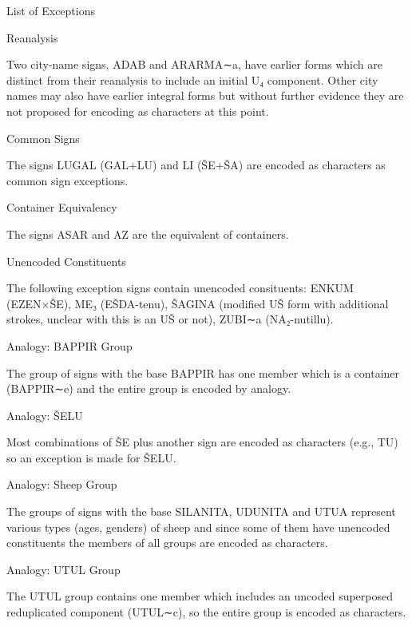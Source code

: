 \Henddl
\Hhh{}List of Exceptions

\Hhhh{}Reanalysis


\par Two city-name signs, ADAB and ARARMA∼a, have earlier forms
      which are distinct from their reanalysis to include an initial
      U₄ component.  Other city names may also have earlier integral
      forms but without further evidence they are not proposed for
      encoding as characters at this point.

\Hhhh{}Common Signs


\par The signs LUGAL (GAL+LU) and LI (ŠE+ŠA) are encoded as
      characters as common sign exceptions.

\Hhhh{}Container Equivalency


\par The signs ASAR and AZ are the equivalent of containers.

\Hhhh{}Unencoded Constituents


\par The following exception signs contain unencoded consituents:
      ENKUM (EZEN×ŠE), ME₃ (EŠDA-tenu), ŠAGINA (modified UŠ form with
      additional strokes, unclear with this is an UŠ or not), ZUBI∼a
      (NA₂-nutillu).

\Hhhh{}Analogy: BAPPIR Group


\par The group of signs with the base BAPPIR has one member which
      is a container (BAPPIR∼e) and the entire group is encoded by
      analogy.

\Hhhh{}Analogy: ŠELU


\par Most combinations of ŠE plus another sign are encoded as
      characters (e.g., TU) so an exception is made for ŠELU.

\Hhhh{}Analogy: Sheep Group


\par The groups of signs with the base SILANITA, UDUNITA and UTUA
      represent various types (ages, genders) of sheep and since some
      of them have unencoded constituents the members of all groups
      are encoded as characters.

\Hhhh{}Analogy: UTUL Group


\par The UTUL group contains one member which includes an uncoded
      superposed reduplicated component (UTUL∼c), so the entire group
      is encoded as characters.

